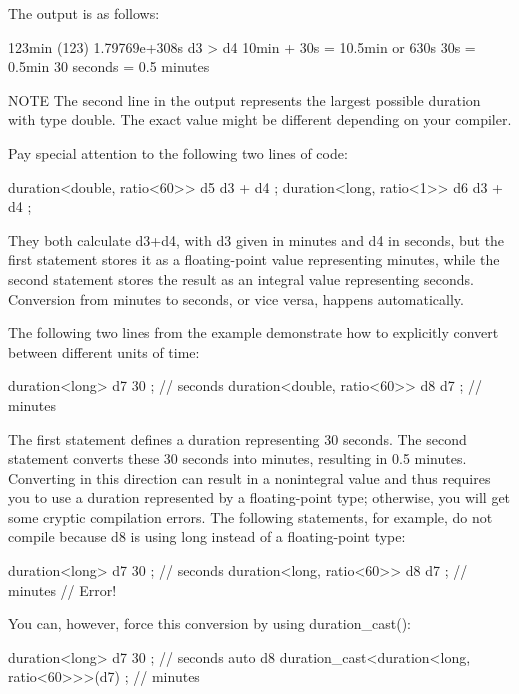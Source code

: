 The output is as follows:

\begin{shell}
123min (123)
1.79769e+308s
d3 > d4
10min + 30s = 10.5min or 630s
30s = 0.5min
30 seconds = 0.5 minutes
\end{shell}

\begin{myNotic}{NOTE}
The second line in the output represents the largest possible duration with type double. The exact value might be different depending on your compiler.
\end{myNotic}

Pay special attention to the following two lines of code:

\begin{cpp}
duration<double, ratio<60>> d5 { d3 + d4 };
duration<long, ratio<1>> d6 { d3 + d4 };
\end{cpp}

They both calculate d3+d4, with d3 given in minutes and d4 in seconds, but the first statement stores it as a floating-point value representing minutes, while the second statement stores the result as an integral value representing seconds. Conversion from minutes to seconds, or vice versa, happens automatically.

The following two lines from the example demonstrate how to explicitly convert between different units of time:

\begin{cpp}
duration<long> d7 { 30 }; // seconds
duration<double, ratio<60>> d8 { d7 }; // minutes
\end{cpp}

The first statement defines a duration representing 30 seconds. The second statement converts these 30 seconds into minutes, resulting in 0.5 minutes. Converting in this direction can result in a nonintegral value and thus requires you to use a duration represented by a floating-point type; otherwise, you will get some cryptic compilation errors. The following statements, for example, do not compile because d8 is using long instead of a floating-point type:

\begin{cpp}
duration<long> d7 { 30 }; // seconds
duration<long, ratio<60>> d8 { d7 }; // minutes // Error!
\end{cpp}

You can, however, force this conversion by using duration\_cast():

\begin{cpp}
duration<long> d7 { 30 }; // seconds
auto d8 { duration_cast<duration<long, ratio<60>>>(d7) }; // minutes
\end{cpp}

